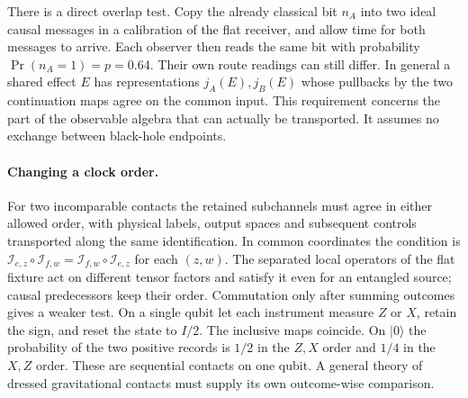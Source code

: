 There is a direct overlap test. Copy the already classical bit \(n_A\) into two ideal causal messages in a calibration of the flat receiver, and allow time for both messages to arrive. Each observer then reads the same bit with probability \(\Pr(n_A=1)=p=0.64\). Their own route readings can still differ. In general a shared effect \(E\) has representations \(j_A(E),j_B(E)\) whose pullbacks by the two continuation maps agree on the common input. This requirement concerns the part of the observable algebra that can actually be transported. It assumes no exchange between black-hole endpoints.

\paragraph{Changing a clock order.}
For two incomparable contacts the retained subchannels must agree in either allowed order, with physical labels, output spaces and subsequent controls transported along the same identification. In common coordinates the condition is
\(\mathcal I_{e,z}\circ\mathcal I_{f,w}=\mathcal I_{f,w}\circ\mathcal I_{e,z}\)
for each \((z,w)\). The separated local operators of the flat fixture act on different tensor factors and satisfy it even for an entangled source; causal predecessors keep their order. Commutation only after summing outcomes gives a weaker test. On a single qubit let each instrument measure \(Z\) or \(X\), retain the sign, and reset the state to \(I/2\). The inclusive maps coincide. On \(|0\rangle\) the probability of the two positive records is \(1/2\) in the \(Z,X\) order and \(1/4\) in the \(X,Z\) order. These are sequential contacts on one qubit. A general theory of dressed gravitational contacts must supply its own outcome-wise comparison.
